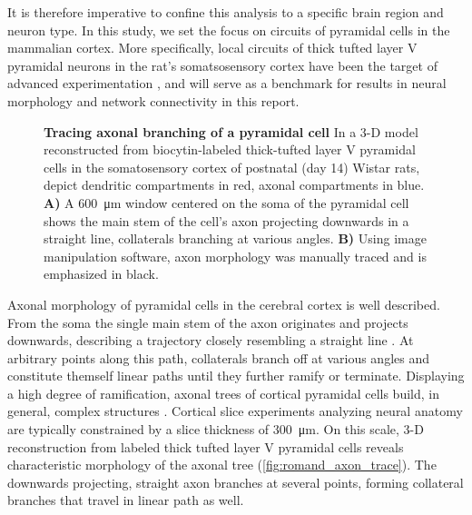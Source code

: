 It is therefore imperative to confine this analysis to a specific
brain region and neuron type. In this study, we set the focus on
circuits of pyramidal cells in the mammalian cortex.
More specifically, local circuits of thick tufted layer V
pyramidal neurons in the rat's somatsosensory cortex have been the
target of advanced
experimentation \parencite{Song2005,Perin2011,Romand2011, Ramaswamy2012}, and will
serve as a benchmark for results in neural morphology and network
connectivity in this report.


\begin{figure}[!htbp]
  \centering 
  \caption{\textbf{Tracing axonal branching of a pyramidal cell} In a
    3-D model reconstructed from biocytin-labeled thick-tufted layer V
    pyramidal cells in the somatosensory cortex of postnatal (day 14)
    Wistar rats, \textcite{Romand2011} depict dendritic compartments in
    red, axonal compartments in blue.  \textbf{A)} A
    \SI{600}{\micro\meter} window centered on the soma of the pyramidal
    cell shows the main stem of the cell's axon projecting downwards in a
    straight line, collaterals branching at various angles. \textbf{B)}
    Using image manipulation software, axon morphology was manually traced
    and is emphasized in black.}    
  \label{fig:romand_axon_trace}
\end{figure}


Axonal morphology of pyramidal cells in the cerebral cortex is well
described. From the soma the single main stem of the axon
originates and projects downwards, describing a trajectory closely
resembling a straight line \parencite{Braitenberg_Cortex}. At
arbitrary points along this path, collaterals branch off at various
angles and constitute themself linear paths until they further ramify
or terminate. Displaying a high degree of ramification, axonal trees
of cortical pyramidal cells build, in general, complex
structures \parencite{Petersen2003,Ramaswamy2012}. Cortical slice
experiments analyzing neural anatomy are typically constrained by a
slice thickness of \SI{300}{\micro\meter}. On this scale, 3-D
reconstruction from labeled thick tufted layer V pyramidal cells
reveals characteristic morphology of the axonal tree
(\autoref{fig:romand_axon_trace}). The downwards projecting, straight
axon branches at several points, forming collateral branches that
travel in linear path as well.

